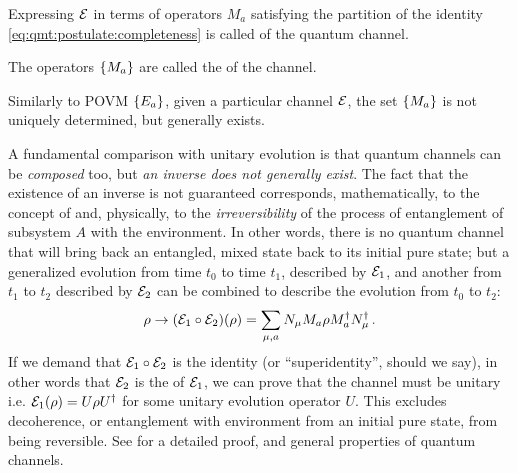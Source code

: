 Expressing $\mathcal{E}$ in terms of operators $M_a$
satisfying the partition of the identity \eqref{eq:qmt:postulate:completeness}
is called
 of the quantum channel.

The operators $\left\{M_a\right\}$ are called the 
of the channel.

Similarly to POVM $\left\{E_a\right\}$, given a particular channel $\mathcal{E}$,
the set $\left\{M_a\right\}$ is not uniquely determined, but
generally exists.

A fundamental comparison with unitary evolution is that
quantum channels can be \emph{composed} too, but \emph{an inverse
does not generally exist}.
The fact that the existence of an inverse is not guaranteed corresponds,
mathematically, to the concept of 
and, physically, to the \emph{irreversibility} of the process
of entanglement of subsystem $A$ with the environment. In other words,
there is no quantum channel that will bring back an entangled,
mixed state back to its initial pure state;
but a generalized evolution from time $t_0$ to time $t_1$,
described by $\mathcal{E}_1$,
and another from $t_1$ to $t_2$ described by $\mathcal{E}_2$
can be combined to describe the evolution from $t_0$ to $t_2$:
\[
  \rho \rightarrow \qty(\mathcal{E}_1 \circ \mathcal{E}_2) (\rho) =
  \sum_{\mu,a} N_{\mu} M_a \rho M_a^{\dagger} N_{\mu}^{\dagger}
  \,\text{.}
\]
If we demand that $\mathcal{E}_1 \circ \mathcal{E}_2$
is the identity (or ``superidentity'', should we say),
in other words that $\mathcal{E}_2$
is the  of $\mathcal{E}_1$,
we can prove that the channel must be unitary i.e.
$\mathcal{E}_1(\rho) = U \rho U^{\dagger}$
for some unitary evolution operator $U$.
This excludes decoherence,
or entanglement with environment from an initial pure state,
from being reversible.
See \cite[]{PreskillNotes} for a detailed proof,
and general properties of quantum channels.
